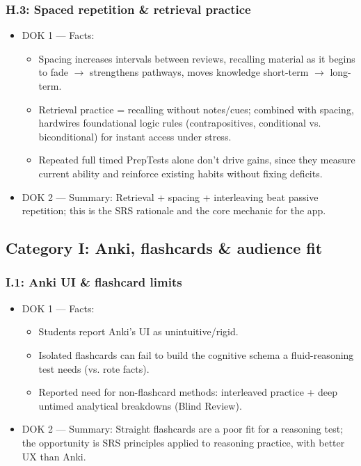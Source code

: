 \documentclass[11pt]{article}
\begin{document}
\subsubsection*{H.3: Spaced repetition \& retrieval practice}
\begin{itemize}
\item DOK 1 --- Facts:
\begin{itemize}
\item Spacing increases intervals between reviews, recalling material as it begins to fade $\rightarrow$ strengthens pathways, moves knowledge short-term $\rightarrow$ long-term.
\item Retrieval practice = recalling without notes/cues; combined with spacing, hardwires foundational logic rules (contrapositives, conditional vs. biconditional) for instant access under stress.
\item Repeated full timed PrepTests alone don't drive gains, since they measure current ability and reinforce existing habits without fixing deficits.
\end{itemize}
\item DOK 2 --- Summary: Retrieval + spacing + interleaving beat passive repetition; this is the SRS rationale and the core mechanic for the app.
\end{itemize}

\subsection*{Category I: Anki, flashcards \& audience fit}
\subsubsection*{I.1: Anki UI \& flashcard limits}
\begin{itemize}
\item DOK 1 --- Facts:
\begin{itemize}
\item Students report Anki's UI as unintuitive/rigid.
\item Isolated flashcards can fail to build the cognitive schema a fluid-reasoning test needs (vs. rote facts).
\item Reported need for non-flashcard methods: interleaved practice + deep untimed analytical breakdowns (Blind Review).
\end{itemize}
\item DOK 2 --- Summary: Straight flashcards are a poor fit for a reasoning test; the opportunity is SRS principles applied to reasoning practice, with better UX than Anki.
\end{itemize}
\end{document}
